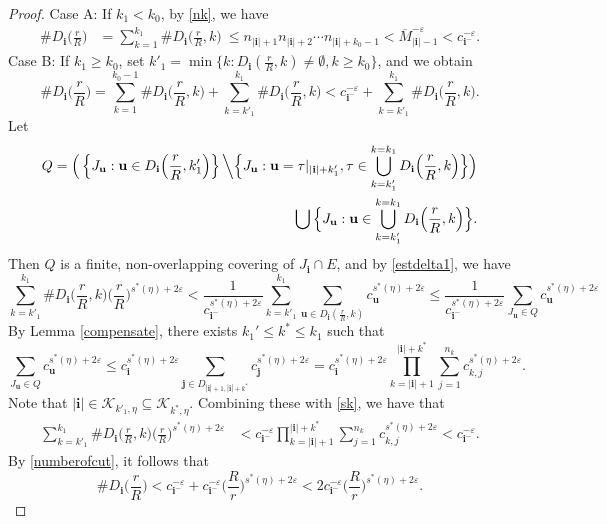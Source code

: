 \documentclass[12pt]{amsart}
\numberwithin{equation}{section}
\theoremstyle{plain}
\theoremstyle{remark}
\theoremstyle{definition}
\newcommand{\kk}{\mathcal{K}}
\newcommand{\om}{\overline{M}}
\newcommand{\iii}{\mathbf{i}}
\newcommand{\jjj}{\mathbf{j}}
\newcommand{\bu}{\mathbf{u}}
\newcommand{\eps}{\varepsilon}
\newcommand{\f}{\frac}
\renewcommand{\ge}{\geqslant}
\renewcommand{\le}{\leqslant}
\renewcommand{\leq}{\leqslant}
\begin{document}
\begin{proof}
		\noindent	Case A: If $k_1 <k_0$,  by \eqref{nk}, we have
		\begin{align*}
			\# D_{\iii}\Big(\f rR\Big)
			&=\sum_{k=1}^{k_1}\# D_{\iii}\Big(\f rR,k\Big)\ \le n_{|\iii|+1}n_{|\iii|+2}\cdots n_{|\iii|+k_0-1} <\om_{|\iii|-1}^{-{\eps}} <c_{\iii^-}^{-{\eps}}.
		\end{align*}
		Case B: If $k_1 \ge k_0$, set $	k'_1=\min\big\{k: D_\iii(\f rR,k)\neq\emptyset,k\ge k_0\big\}$, and  we obtain
		\begin{equation}\label{numberofcut}
			\# D_{\iii}\Big(\f rR\Big)
			=\sum_{k=1}^{k_0-1}\# D_{\iii}\Big(\f rR,k\Big)+\sum_{k=k'_1}^{k_1}\# D_{\iii}\Big(\f rR,k\Big)<c_{\iii^-}^{-{\eps}}+\sum_{k=k'_1}^{k_1}\#D_{\iii}\Big(\f rR,k\Big).
		\end{equation}
	Let
		\begin{align*}
			Q=\Big(\left\{J_\bu:\bu\in D_\iii\Big(\f rR,k'_1\Big)\right\}\Big\backslash \Big\{J_{\bu}:\bu=\mathbf{\tau}|_{|\iii|+k'_1},\mathbf{\tau}\in\bigcup_{k=k'_1}^{k=k_1}D_{\iii}\Big(\f rR,k\Big)\Big\}\Big)\\
			\bigcup \Big\{J_{\bu}:\bu\in \bigcup_{k=k'_1}^{k=k_1}D_{\iii}\Big(\f rR,k\Big)\Big\}.
		\end{align*}
	Then $Q$ is a finite, non-overlapping covering of $J_\iii \cap E$, and by \eqref{estdelta1}, we have 
		$$	
		\sum_{k=k'_1}^{k_1}\# D_{\iii}\Big(\f rR,k\Big)\Big(\f rR\Big)^{s^*(\eta)+2\eps} <\frac1 {c_{\iii^-}^{s^*(\eta)+2\eps}}\sum_{k=k'_1}^{k_1}\sum_{\bu\in D_{\iii}(\f rR,k)}c_{\bu}^{s^*(\eta)+2\eps} 
		\le\frac1 {c_{\iii^-}^{s^*(\eta)+2\eps}}\sum_{J_\bu\in Q}c_{\bu}^{s^*(\eta)+2\eps}
		$$	
		By Lemma \ref{compensate},  there exists  $k_1'\leq k^*\leq k_1$ such that  
		$$
		\sum_{J_\bu\in Q}c_{\bu}^{s^*(\eta)+2\eps}\leq c_{\iii}^{s^*(\eta)+2\eps}\sum_{\jjj\in  D_{|\iii|+1,|\iii|+k^*}}c_{\jjj}^{s^*(\eta)+2\eps}= c_{\iii}^{s^*(\eta)+2\eps} \prod_{k=|\iii|+1}^{|\iii|+k^*}\sum_{j=1}^{n_k}c_{k,j}^{s^*(\eta)+2\eps}.
		$$
		Note that $|\iii|\in \kk_{k'_1,\eta}\subseteq \kk_{k^*,\eta}$.   Combining these with	\eqref{sk}, we have that
		\begin{equation*} %
			\begin{aligned}
				\sum_{k=k'_1}^{k_1}\# D_{\iii}\Big(\f rR,k\Big)\Big(\f rR\Big)^{s^*(\eta)+2\eps}
				&<c_{\iii^-}^{-\eps}\prod_{k=|\iii|+1}^{|\iii|+k^*}\sum_{j=1}^{n_k}c_{k,j}^{s^*(\eta)+2\eps}<c_{\iii^-}^{-\eps}.
			\end{aligned}
		\end{equation*}  
		By  \eqref{numberofcut}, it follows that
		\begin{equation*}
			\#D_{\iii}\Big(\f rR\Big)< c_{\iii^-}^{-{\eps}}+c_{\iii^-}^{-{\eps}}\Big(\f Rr \Big)^{s^*(\eta)+2\eps}< 2c_{\iii^-}^{-{\eps}}\Big(\f Rr\Big)^{s^*(\eta)+2\eps}.
		\end{equation*}
		

\end{proof}
\end{document}
